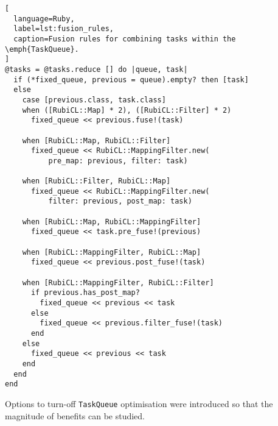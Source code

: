 \begin{lstlisting}[
  language=Ruby,
  label=lst:fusion_rules,
  caption=Fusion rules for combining tasks within the \emph{TaskQueue}.
]
@tasks = @tasks.reduce [] do |queue, task|
  if (*fixed_queue, previous = queue).empty? then [task]
  else
    case [previous.class, task.class]
    when ([RubiCL::Map] * 2), ([RubiCL::Filter] * 2)
      fixed_queue << previous.fuse!(task)

    when [RubiCL::Map, RubiCL::Filter]
      fixed_queue << RubiCL::MappingFilter.new(
          pre_map: previous, filter: task)

    when [RubiCL::Filter, RubiCL::Map]
      fixed_queue << RubiCL::MappingFilter.new(
          filter: previous, post_map: task)

    when [RubiCL::Map, RubiCL::MappingFilter]
      fixed_queue << task.pre_fuse!(previous)

    when [RubiCL::MappingFilter, RubiCL::Map]
      fixed_queue << previous.post_fuse!(task)

    when [RubiCL::MappingFilter, RubiCL::Filter]
      if previous.has_post_map?
        fixed_queue << previous << task
      else
        fixed_queue << previous.filter_fuse!(task)
      end
    else
      fixed_queue << previous << task
    end
  end
end
\end{lstlisting}

Options to turn-off \verb|TaskQueue| optimisation were introduced so that the magnitude of benefits can be studied.
